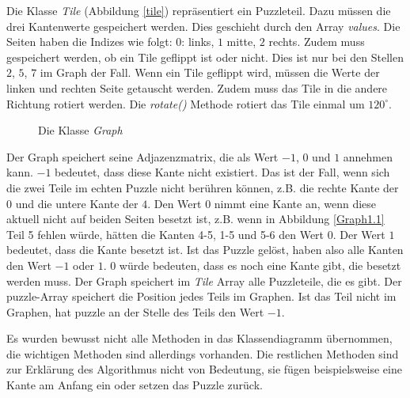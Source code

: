 \documentclass[a4paper, 12pt]{scrartcl}
\begin{document}
Die Klasse \emph{Tile} (Abbildung \ref{tile}) repräsentiert ein Puzzleteil. Dazu müssen die drei Kantenwerte gespeichert werden. Dies geschieht durch den Array \emph{values}. Die Seiten haben die Indizes wie folgt: $0$: links, $1$ mitte, $2$ rechts. Zudem muss gespeichert werden, ob ein Tile geflippt ist oder nicht. Dies ist nur bei den Stellen $2$, $5$, $7$ im Graph der Fall. Wenn ein Tile geflippt wird, müssen die Werte der linken und rechten Seite getauscht werden. Zudem muss das Tile in die andere Richtung rotiert werden. Die \emph{rotate()} Methode rotiert das Tile einmal um $120^\circ$.

\begin{figure}[h]
    \centering
    \caption{Die Klasse \emph{Graph}}
\end{figure}

Der Graph speichert seine Adjazenzmatrix, die als Wert $-1$, $0$ und $1$ annehmen kann. $-1$ bedeutet, dass diese Kante nicht existiert. Das ist der Fall, wenn sich die zwei Teile im echten Puzzle nicht berühren können, z.B. die rechte Kante der $0$ und die untere Kante der $4$. Den Wert $0$ nimmt eine Kante an, wenn diese aktuell nicht auf beiden Seiten besetzt ist, z.B. wenn in Abbildung \ref{Graph1.1} Teil 5 fehlen würde, hätten die Kanten 4-5, 1-5 und 5-6 den Wert $0$. Der Wert $1$ bedeutet, dass die Kante besetzt ist. Ist das Puzzle gelöst, haben also alle Kanten den Wert $-1$ oder $1$. $0$ würde bedeuten, dass es noch eine Kante gibt, die besetzt werden muss. Der Graph speichert im \emph{Tile} Array alle Puzzleteile, die es gibt. Der puzzle-Array speichert die Position jedes Teils im Graphen. Ist das Teil nicht im Graphen, hat puzzle an der Stelle des Teils den Wert $-1$.

Es wurden bewusst nicht alle Methoden in das Klassendiagramm übernommen, die wichtigen Methoden sind allerdings vorhanden. Die restlichen Methoden sind zur Erklärung des Algorithmus nicht von Bedeutung, sie fügen beispielsweise eine Kante am Anfang ein oder setzen das Puzzle zurück.
\end{document}
